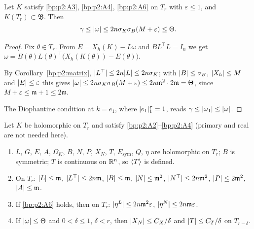 \begin{lemma}\label{bp:p2:frequency}
Let $K$ satisfy \ref{bp:p2:A3}, \ref{bp:p2:A4}, \ref{bp:p2:A6} on $T_r$ with $\varepsilon\le1$, and
$K(T_r)\subset\mathfrak B$. Then
\[
\gamma\le\lvert \omega\rvert\le2n\sigma_K\sigma_B(M+\varepsilon)\le\Theta.
\]
\end{lemma}

\begin{proof}
\label{step:p2:freq-solve}
Fix $\theta\in T_r$. From $E=X_h(K)-L\omega$ and $BL^\top L=I_n$ we get
$\omega=B(\theta)L(\theta)^\top\bigl(X_h(K(\theta))-E(\theta)\bigr)$.

\label{step:p2:freq-upper}
By Corollary~\ref{bp:p2:matrix}, $\lvert L^\top\rvert\le2n\lvert L\rvert\le2n\sigma_K$; with $\lvert B\rvert\le\sigma_B$,
$\lvert X_h\rvert\le M$ and $\lvert E\rvert\le\varepsilon$ this gives $\lvert \omega\rvert\le2n\sigma_K\sigma_B(M+\varepsilon)
\le2n\mathfrak m^2\cdot2\mathfrak m=\Theta$, since $M+\varepsilon\le\mathfrak m+1\le2\mathfrak m$.

\label{step:p2:freq-lower}
The Diophantine condition at $k=e_1$, where $\lvert e_1\rvert_1^\tau=1$, reads $\gamma\le\lvert \omega_1\rvert\le
\lvert \omega\rvert$.
\end{proof}

\begin{lemma}\label{bp:p2:frame-basic}
Let $K$ be holomorphic on $T_r$ and satisfy \ref{bp:p2:A2}--\ref{bp:p2:A4} (primary and real are not
needed here).
\begin{enumerate}[label=(\alph*)]
\item $L$, $G$, $E$, $A$, $\Omega_K$, $B$, $N$, $P$, $X_N$, $T$, $E_{\mathrm{sym}}$, $Q$, $\eta$ are
  holomorphic on $T_r$; $B$ is symmetric; $T$ is continuous on $\mathbb{R}^n$, so $\langle T\rangle$ is defined.
\item On $T_r$: $\lvert L\rvert\le\mathfrak m$, $\lvert L^\top\rvert\le2n\mathfrak m$, $\lvert B\rvert\le\mathfrak m$,
  $\lvert N\rvert\le\mathfrak m^2$, $\lvert N^\top\rvert\le2n\mathfrak m^2$, $\lvert P\rvert\le2\mathfrak m^2$,
  $\lvert A\rvert\le\mathfrak m$.
\item If \ref{bp:p2:A6} holds, then on $T_r$: $\lvert \eta^L\rvert\le2n\mathfrak
  m^2\varepsilon$, $\lvert \eta^N\rvert\le2n\mathfrak m\varepsilon$.
\item If $\lvert \omega\rvert\le\Theta$ and $0<\delta\le1$, $\delta<r$, then $\lvert X_N\rvert\le C_X/\delta$ and
  $\lvert T\rvert\le C_T/\delta$ on $T_{r-\delta}$.
\end{enumerate}
\end{lemma}

